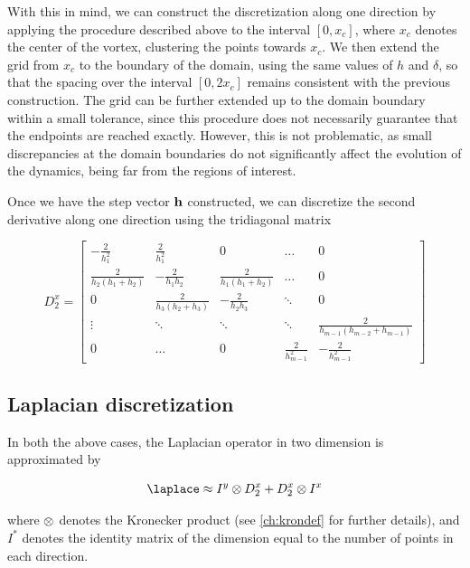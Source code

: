 With this in mind, we can construct the discretization along one direction by applying the procedure described above to the interval $[0, x_c]$, where $x_c$ denotes the center of the vortex, clustering the points towards $x_c$.  
We then extend the grid from $x_c$ to the boundary of the domain, using the same values of $h$ and $\delta$, so that the spacing over the interval $[0, 2x_c]$ remains consistent with the previous construction.  
The grid can be further extended up to the domain boundary within a small tolerance, since this procedure does not necessarily guarantee that the endpoints are reached exactly.  
However, this is not problematic, as small discrepancies at the domain boundaries do not significantly affect the evolution of the dynamics, being far from the regions of interest.

Once we have the step vector $\mathbf{h}$ constructed, we can discretize the second derivative along one direction using the tridiagonal matrix

\[
    D_2^x =
    \begin{bmatrix}
        -\frac{2}{h_1^2} & \frac{2}{h_1^2} & 0 & \dots & 0 \\
        \frac{2}{h_2(h_1+h_2)} & -\frac{2}{h_1 h_2} & \frac{2}{h_1(h_1+h_2)} & \dots & 0 \\
        0 & \frac{2}{h_3(h_2+h_3)} & -\frac{2}{h_2 h_3} & \ddots & 0 \\
        \vdots & \ddots & \ddots & \ddots & \frac{2}{h_{m-1}(h_{m-2}+h_{m-1})} \\
        0 & \dots & 0 & \frac{2}{h_{m-1}^2} & -\frac{2}{h_{m-1}^2}
    \end{bmatrix}
\]

\subsection{Laplacian discretization}

In both the above cases, the Laplacian operator in two dimension is approximated by 

\begin{equation}
    \lap \approx I^y \kron D_2^x + D_2^x \kron I^x
    \label{eq:lapprox}
\end{equation}

where $\otimes$ denotes the Kronecker product (see \ref{ch:krondef} for further details), and $I^*$ denotes the identity matrix of the dimension equal to the number of points in each direction.
